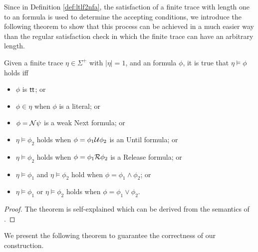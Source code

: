 Since in Definition \ref{def:ltlf2nfa}, the satisfaction of a finite trace with length one to an \ltlf formula is used to determine the accepting conditions, we introduce the following theorem to show that this process can be achieved in a much easier way than the regular satisfaction check in which the finite trace can have an arbitrary length.

\begin{theorem}\label{thm:oneSat}
Given a finite trace $\eta \in \Sigma^{+}$ with $|\eta|=1$, and an \ltlf formula $\phi$, it is true that $\eta \models \phi$ holds iff
\begin{itemize}
	\item $\phi$ is $\tt$; or 
	\item $\phi \in\eta$ when $\phi$ is a literal; or
	\item $\phi=\N \psi$ is a weak Next formula; or
	\item $\eta \models \phi_{2}$ holds when $\phi=\phi_{1} \U \phi_{2}$ is an Until formula; or  
	\item $\eta \models \phi_{2}$ holds when $\phi=\phi_{1} \R \phi_{2}$ is a Release formula; or
	\item $\eta \models \phi_{1}$ and $\eta \models \phi_{2}$ hold when $\phi=\phi_{1} \wedge \phi_{2}$; or
	\item $\eta \models \phi_{1}$ or $\eta \models \phi_{2}$ holds when $\phi=\phi_{1} \vee \phi_{2}$.
\end{itemize}
\end{theorem}

\begin{proof}
The theorem is self-explained which can be derived from the semantics of \ltlf.
\end{proof}

We present the following theorem to guarantee the correctness of our construction. 

